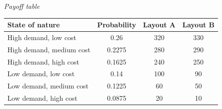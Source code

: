 \begin{ExamProblems}
\begin{center}
		\end{center}
		\begin{center}
			\textit{Payoff table} \\
			\begin{tabular}{l c c c}
				\toprule
				State of nature & Probability & Layout A & Layout B \\
				\midrule
				High demand, low cost & 0.26 & 320 & 330 \\
				High demand, medium cost & 0.2275 & 280 & 290 \\
				High demand, high cost & 0.1625 & 240 & 250 \\
				Low demand, low cost & 0.14 & 100 & 90 \\
				Low demand, medium cost & 0.1225 & 60 & 50 \\
				Low demand, high cost & 0.0875 & 20 & 10 \\
				\bottomrule
			\end{tabular}
		\end{center}
		

\end{ExamProblems}
